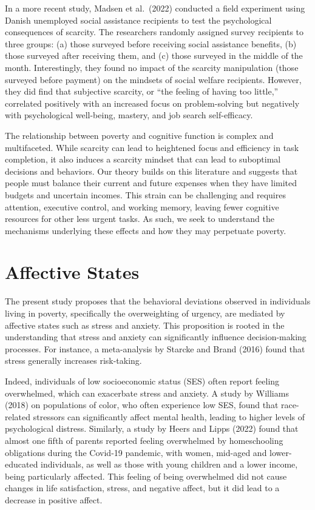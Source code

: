 \documentclass[
]{report}
\begin{document}
In a more recent study, Madsen et al.~(2022) conducted a field
experiment using Danish unemployed social assistance recipients to test
the psychological consequences of scarcity. The researchers randomly
assigned survey recipients to three groups: (a) those surveyed before
receiving social assistance benefits, (b) those surveyed after receiving
them, and (c) those surveyed in the middle of the month. Interestingly,
they found no impact of the scarcity manipulation (those surveyed before
payment) on the mindsets of social welfare recipients. However, they did
find that subjective scarcity, or ``the feeling of having too little,''
correlated positively with an increased focus on problem-solving but
negatively with psychological well-being, mastery, and job search
self-efficacy.

The relationship between poverty and cognitive function is complex and
multifaceted. While scarcity can lead to heightened focus and efficiency
in task completion, it also induces a scarcity mindset that can lead to
suboptimal decisions and behaviors. Our theory builds on this literature
and suggests that people must balance their current and future expenses
when they have limited budgets and uncertain incomes. This strain can be
challenging and requires attention, executive control, and working
memory, leaving fewer cognitive resources for other less urgent tasks.
As such, we seek to understand the mechanisms underlying these effects
and how they may perpetuate poverty.

\hypertarget{affective-states}{%
\section{Affective States}\label{affective-states}}

The present study proposes that the behavioral deviations observed in
individuals living in poverty, specifically the overweighting of
urgency, are mediated by affective states such as stress and anxiety.
This proposition is rooted in the understanding that stress and anxiety
can significantly influence decision-making processes. For instance, a
meta-analysis by Starcke and Brand (2016) found that stress generally
increases risk-taking.

Indeed, individuals of low socioeconomic status (SES) often report
feeling overwhelmed, which can exacerbate stress and anxiety. A study by
Williams (2018) on populations of color, who often experience low SES,
found that race-related stressors can significantly affect mental
health, leading to higher levels of psychological distress. Similarly, a
study by Heers and Lipps (2022) found that almost one fifth of parents
reported feeling overwhelmed by homeschooling obligations during the
Covid-19 pandemic, with women, mid-aged and lower-educated individuals,
as well as those with young children and a lower income, being
particularly affected. This feeling of being overwhelmed did not cause
changes in life satisfaction, stress, and negative affect, but it did
lead to a decrease in positive affect.
\end{document}
